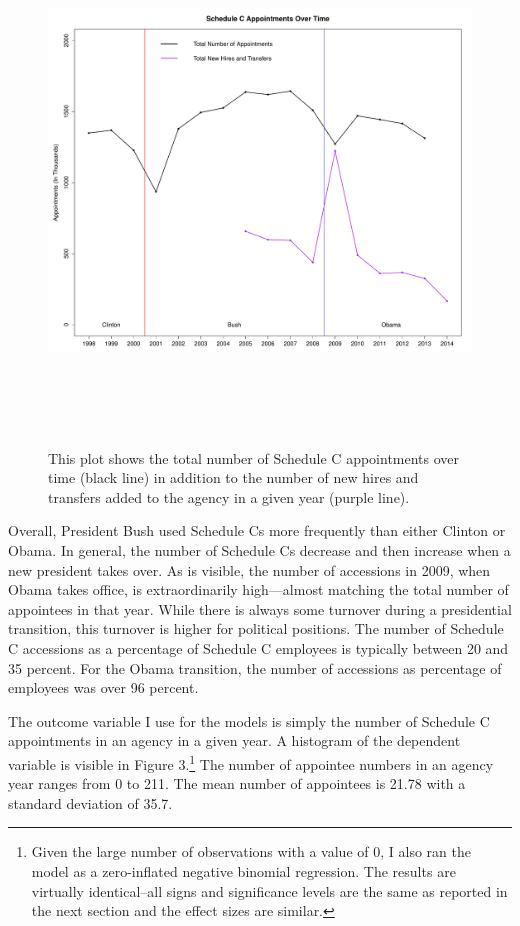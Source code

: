 \documentclass[12pt]{article}
\begin{document}
\begin{figure}[!htb]
\begin{center}
\includegraphics[height=5.5in,width=7in]{SCAptsandAccOverTime.pdf}
\caption{This plot shows the total number of Schedule C appointments over time (black line) in addition to the number of new hires and transfers added to the agency in a given year (purple line).}
\end{center}
\end{figure}

Overall, President Bush used Schedule Cs more frequently than either Clinton or Obama. In general, the number of Schedule Cs decrease and then increase when a new president takes over. As is visible, the number of accessions in 2009, when Obama takes office, is extraordinarily high---almost matching the total number of appointees in that year. While there is always some turnover during a presidential transition, this turnover is higher for political positions. The number of Schedule C accessions as a percentage of Schedule C employees is typically between 20 and 35 percent. For the Obama transition, the number of accessions as percentage of employees was over 96 percent.

The outcome variable I use for the models is simply the number of Schedule C appointments in an agency in a given year. A histogram of the dependent variable is visible in Figure 3.\footnote{Given the large number of observations with a value of 0, I also ran the model as a zero-inflated negative binomial regression. The results are virtually identical--all signs and significance levels are the same as reported in the next section and the effect sizes are similar.} The number of appointee numbers in an agency year ranges from 0 to 211. The mean number of appointees is 21.78 with a standard deviation of 35.7.
\end{document}
